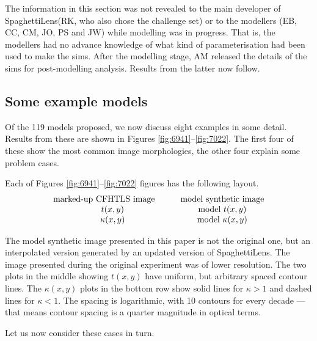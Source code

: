 \documentclass[usenatbib]{mn2e}
\newcommand{\spl}{SpaghettiLens\xspace}
\begin{document}
\FloatBarrier

The information in this section was not revealed to the main developer
of \spl (RK, who also chose the challenge set) or to the modellers
(EB, CC, CM, JO, PS and JW) while modelling was in progress.  That is,
the modellers had no advance knowledge of what kind of
parameterisation had been used to make the sims.  After the modelling
stage, AM released the details of the sims for post-modelling
analysis.  Results from the latter now follow.



\subsection{Some example models} \label{sec:example_models}

Of the 119 models proposed, we now discuss eight examples in some
detail.  Results from these are shown in Figures
\ref{fig:6941}--\ref{fig:7022}.  The first four of these show the most
common image morphologies, the other four explain some problem cases.

Each of Figures \ref{fig:6941}--\ref{fig:7022} figures has the
following layout.
$$ \begin{matrix}
\hbox{marked-up CFHTLS image} \qquad &\hbox{model synthetic image} \\
t(x,y)                               &\hbox{model } t(x,y) \\
\kappa(x,y)                          &\hbox{model } \kappa(x,y)
\end{matrix} $$

The model synthetic image presented in this paper is not the original one,
but an interpolated version generated by an updated version of \spl. The image
presented during the original experiment was of lower resolution. The two plots in
the middle showing $t(x,y)$ have uniform, but arbitrary spaced contour lines.
The $\kappa(x,y)$ plots in the bottom row show solid lines for $\kappa>1$
and dashed lines for $\kappa<1$. The spacing is logarithmic, with 10 contours
for every decade --- that means contour spacing is a quarter magnitude in
optical terms.

Let us now consider these cases in turn.
\end{document}
